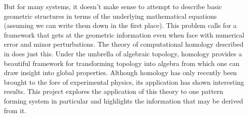 	But for many systems, it doesn't make sense to attempt to describe basic geometric structures in terms of the underlying mathematical equations (assuming we can write them down in the first place). This problem calls for a framework that gets at the geometric information even when face with numerical error and minor perturbations. The theory of computational homology described in  does just this. Under the umbrella of algebraic topology, homology provides a beautiful framework for transforming topology into algebra from which one can draw insight into global properties. Although homology has only recently been brought to the fore of experimental physics, its application has shown interesting results. This project explores the application of this theory to one pattern forming system in particular and highlights the information that may be derived from it.
	
	
	
	
	
	